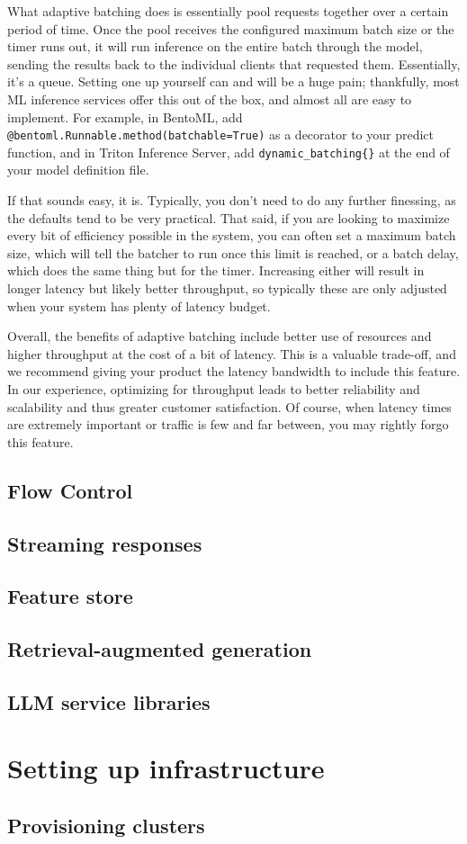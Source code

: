 What adaptive batching does is essentially pool requests together over a certain period of time. Once the pool receives the configured maximum batch size or the timer runs out, it will run inference on the entire batch through the model, sending the results back to the individual clients that requested them. Essentially, it's a queue. Setting one up yourself can and will be a huge pain; thankfully, most ML inference services offer this out of the box, and almost all are easy to implement. For example, in BentoML, add \texttt{@bentoml.Runnable.method(batchable=True)} as a decorator to your predict function, and in Triton Inference Server, add \texttt{dynamic\_batching\{\}} at the end of your model definition file.

If that sounds easy, it is. Typically, you don't need to do any further finessing, as the defaults tend to be very practical. That said, if you are looking to maximize every bit of efficiency possible in the system, you can often set a maximum batch size, which will tell the batcher to run once this limit is reached, or a batch delay, which does the same thing but for the timer. Increasing either will result in longer latency but likely better throughput, so typically these are only adjusted when your system has plenty of latency budget.

Overall, the benefits of adaptive batching include better use of resources and higher throughput at the cost of a bit of latency. This is a valuable trade-off, and we recommend giving your product the latency bandwidth to include this feature. In our experience, optimizing for throughput leads to better reliability and scalability and thus greater customer satisfaction. Of course, when latency times are extremely important or traffic is few and far between, you may rightly forgo this feature.


\subsection{Flow Control}

\subsection{Streaming responses}
\subsection{Feature store}
\subsection{Retrieval-augmented generation}
\subsection{LLM service libraries}

\section{Setting up infrastructure}
\subsection{Provisioning clusters}
